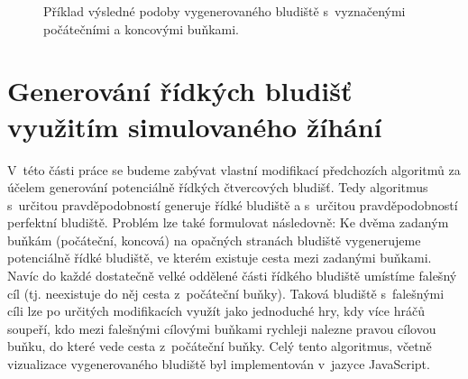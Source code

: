 \documentclass[a4paper,12pt]{article}
\begin{document}
\begin{figure}[h]
\begin{center}
  \end{center}
  \caption{Příklad výsledné podoby vygenerovaného bludiště s~vyznačenými počátečními a koncovými buňkami.}
  \label{fig:res}
\end{figure}

\newpage

\section{Generování řídkých bludišť využitím simulovaného žíhání}
V~této části práce se budeme zabývat vlastní modifikací předchozích algoritmů za účelem generování potenciálně řídkých 
čtvercových bludišť. Tedy algoritmus s~určitou pravděpodobností generuje řídké bludiště a s~určitou pravděpodobností
perfektní bludiště. Problém lze také formulovat následovně: Ke dvěma zadaným buňkám (počáteční, koncová) na opačných stranách bludiště 
vygenerujeme potenciálně řídké bludiště, ve kterém existuje cesta mezi zadanými buňkami. Navíc do 
každé dostatečně velké oddělené části řídkého bludiště umístíme falešný cíl (tj. neexistuje do něj cesta z~počáteční buňky).
Taková bludiště s~falešnými cíli lze po určitých modifikacích využít jako jednoduché hry, kdy více hráčů soupeří, kdo 
mezi falešnými cílovými buňkami rychleji nalezne pravou cílovou buňku, do které vede cesta z~počáteční buňky.
Celý tento algoritmus, včetně vizualizace vygenerovaného bludiště byl implementován v~jazyce JavaScript.
\end{document}
